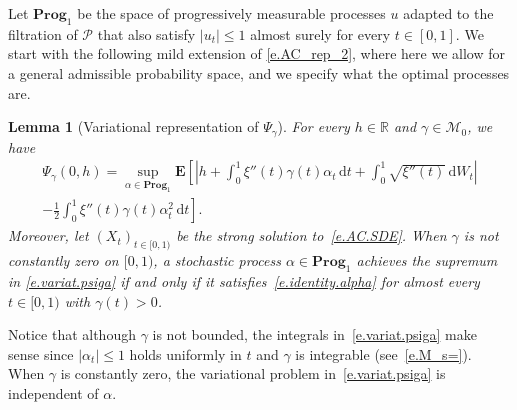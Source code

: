 \documentclass[11pt]{amsart}
\newtheorem{lemma}[proposition]{Lemma}
\theoremstyle{remark}
\theoremstyle{definition}
\numberwithin{equation}{section}
\numberwithin{proposition}{section}
\numberwithin{figure}{section}
\numberwithin{table}{section}
\newcommand{\R}{\mathbb{R}}
\newcommand{\EE}{\mathbf{E}}
\newcommand{\PP}{\mathbf{P}}
\renewcommand{\leq}{\leqslant}
\newcommand{\1}{\mathbf{1}}
\newcommand{\mcl}{\mathcal}
\newcommand{\msc}{\mathscr}
\newcommand{\al}{\alpha}
\newcommand{\ga}{\gamma}
\newcommand{\bprog}{\mathbf{Prog}}
\begin{document}



Let $\bprog_1$ be the space of progressively measurable processes $u$ adapted to the filtration of $\msc P$ that also satisfy $|u_t|\leq 1$ almost surely for every $t\in[0,1]$. We start with the following mild extension of \eqref{e.AC_rep_2}, where here we allow for a general admissible probability space, and we specify what the optimal processes are.


\begin{lemma}[Variational representation of $\Psi_\ga$]
\label{l.variat.psiga}
For every $h \in \R$ and $\ga \in \mcl M_0$, we have
\begin{multline}
\label{e.variat.psiga}
\Psi_\ga(0,h) = \sup_{\alpha\in\bprog_1} \EE \left[ 
\left|h+\int_{0}^{1}\xi''(t)\ga(t)\alpha_t \, \mathrm{d}t+\int_0^1\sqrt{\xi''(t)}\, \mathrm{d} W_t\right| \right. \\
\left. - \frac{1}{2}\int_{0}^{1}\xi''(t)\gamma(t)\alpha^{2}_t\, \mathrm{d}t \right].
\end{multline}
Moreover, let $(X_t)_{t \in [0,1)}$ be the strong solution to~\eqref{e.AC.SDE}.
When $\gamma$ is not constantly zero on $[0,1)$, a stochastic process $\al \in \bprog_1$ achieves the supremum in \eqref{e.variat.psiga} if and only if it satisfies~\eqref{e.identity.alpha} for almost every $t \in [0,1)$ with $\gamma(t) > 0$.
\end{lemma}


Notice that although $\gamma$ is not bounded, the integrals in~\eqref{e.variat.psiga} make sense since $|\alpha_t|\leq 1$ holds uniformly in $t$ and $\gamma$ is integrable (see~\eqref{e.M_s=}).
When $\gamma$ is constantly zero, the variational problem in~\eqref{e.variat.psiga} is independent of $\alpha$.
\end{document}
